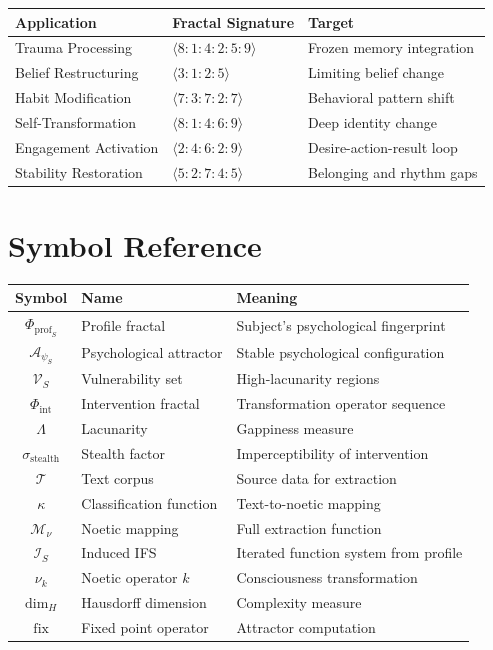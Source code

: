 \documentclass[11pt,twoside]{book}
\renewcommand{\arraystretch}{1.2}
\newcommand{\noe}[1]{\nu_{#1}}
\newcommand{\HausdorffDim}{\dim_H}
\newcommand{\fix}{\mathrm{fix}}
\newcommand{\Lacunarity}{\Lambda}
\newcommand{\PsychAttractor}{\mathcal{A}_\psi}
\newcommand{\ManipFrac}{\Phi_{\mathrm{int}}}
\newcommand{\ProfileFrac}{\Phi_{\mathrm{prof}}}
\newcommand{\VulnSet}{\mathcal{V}}
\newcommand{\StealthFactor}{\sigma_{\mathrm{stealth}}}
\newcommand{\TextCorpus}{\mathcal{T}}
\newcommand{\NoetMap}{\mathcal{M}_\nu}
\newcommand{\IFS}{\mathcal{I}_S}
\begin{document}
\begin{center}
\footnotesize
\renewcommand{\arraystretch}{1.3}
\begin{tabular}{l|l|l}
\toprule
\textbf{Application} & \textbf{Fractal Signature} & \textbf{Target} \\
\midrule
Trauma Processing & $\langle 8:1:4:2:5:9 \rangle$ & Frozen memory integration \\
Belief Restructuring & $\langle 3:1:2:5 \rangle$ & Limiting belief change \\
Habit Modification & $\langle 7:3:7:2:7 \rangle$ & Behavioral pattern shift \\
Self-Transformation & $\langle 8:1:4:6:9 \rangle$ & Deep identity change \\
Engagement Activation & $\langle 2:4:6:2:9 \rangle$ & Desire-action-result loop \\
Stability Restoration & $\langle 5:2:7:4:5 \rangle$ & Belonging and rhythm gaps \\
\bottomrule
\end{tabular}
\end{center}

\chapter{Symbol Reference}
\label{app:symbols}

\begin{center}
\renewcommand{\arraystretch}{1.2}
\begin{longtable}{c|l|l}
\toprule
\textbf{Symbol} & \textbf{Name} & \textbf{Meaning} \\
\midrule
\endhead
$\ProfileFrac_S$ & Profile fractal & Subject's psychological fingerprint \\
$\PsychAttractor_S$ & Psychological attractor & Stable psychological configuration \\
$\VulnSet_S$ & Vulnerability set & High-lacunarity regions \\
$\ManipFrac$ & Intervention fractal & Transformation operator sequence \\
$\Lacunarity$ & Lacunarity & Gappiness measure \\
$\StealthFactor$ & Stealth factor & Imperceptibility of intervention \\
$\TextCorpus$ & Text corpus & Source data for extraction \\
$\kappa$ & Classification function & Text-to-noetic mapping \\
$\NoetMap$ & Noetic mapping & Full extraction function \\
$\IFS$ & Induced IFS & Iterated function system from profile \\
$\noe{k}$ & Noetic operator $k$ & Consciousness transformation \\
$\HausdorffDim$ & Hausdorff dimension & Complexity measure \\
$\fix$ & Fixed point operator & Attractor computation \\
\bottomrule
\end{longtable}
\end{center}
\end{document}

